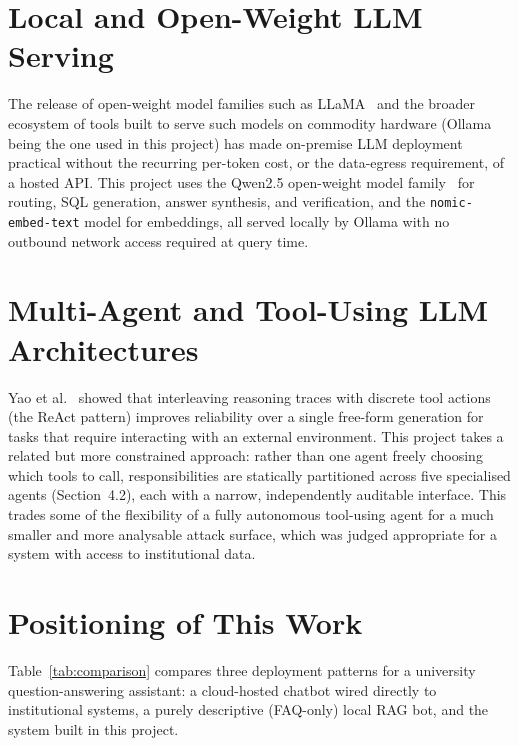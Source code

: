 \documentclass[11pt,a4paper,oneside]{report}
\begin{document}
\section{Local and Open-Weight LLM Serving}

The release of open-weight model families such as LLaMA~\cite{touvron2023llama}
and the broader ecosystem of tools built to serve such models on
commodity hardware (Ollama being the one used in this project) has made
on-premise LLM deployment practical without the recurring per-token cost, or
the data-egress requirement, of a hosted API. This project uses the
Qwen2.5 open-weight model family~\cite{qwen2024} for routing, SQL generation,
answer synthesis, and verification, and the \texttt{nomic-embed-text} model
for embeddings, all served locally by Ollama with no outbound network access
required at query time.

\section{Multi-Agent and Tool-Using LLM Architectures}

Yao et al.~\cite{yao2023react} showed that interleaving reasoning traces with
discrete tool actions (the ReAct pattern) improves reliability over a single
free-form generation for tasks that require interacting with an external
environment. This project takes a related but more constrained approach:
rather than one agent freely choosing which tools to call, responsibilities
are statically partitioned across five specialised agents (Section~4.2), each
with a narrow, independently auditable interface. This trades some of the
flexibility of a fully autonomous tool-using agent for a much smaller and
more analysable attack surface, which was judged appropriate for a system
with access to institutional data.

\section{Positioning of This Work}

Table~\ref{tab:comparison} compares three deployment patterns for a
university question-answering assistant: a cloud-hosted chatbot wired
directly to institutional systems, a purely descriptive (FAQ-only) local RAG
bot, and the system built in this project.
\end{document}
